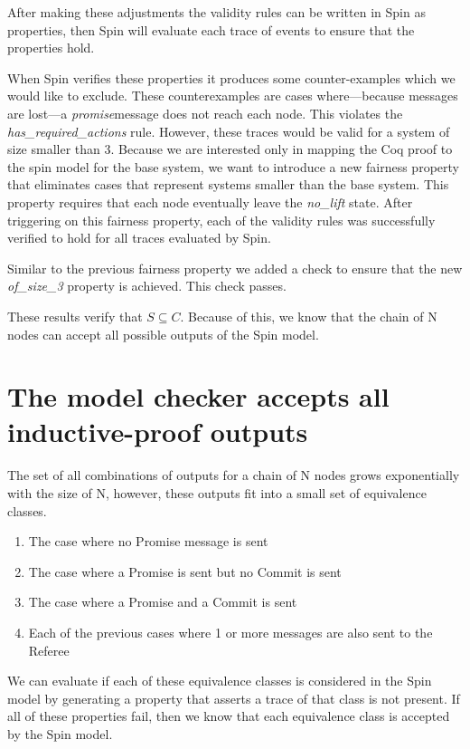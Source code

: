 \documentclass[runningheads]{llncs}
\newcommand{\promise}{\emph{promise}}
\newif\ifcomments
\newcommand{\krs}[1]{\ifcomments\textcolor{blue}{krs: #1}\fi}
\begin{document}
After making these adjustments the validity rules can be written in Spin as properties, then Spin will evaluate each trace of events to ensure that the properties hold. 

When Spin verifies these properties it produces some counter-examples which we would like to exclude. These counterexamples are cases where---because messages are lost---a \promise message does not reach each node. This violates the \emph{has\_required\_actions} rule. However, these traces would be valid for a system of size smaller than 3. Because we are interested only in mapping the Coq proof to the spin model for the base system, we want to introduce a new fairness property that eliminates cases that represent systems smaller than the base system. This property requires that each node eventually leave the \emph{no\_lift} state. After triggering on this fairness property, each of the validity rules was successfully verified to hold for all traces evaluated by Spin. 

Similar to the previous fairness property we added a check to ensure that the new \emph{of\_size\_3} property is achieved. This check passes.

These results verify that $S \subseteq C$. Because of this, we know that the chain of N nodes can accept all possible outputs of the Spin model. 

\section{The model checker accepts all inductive-proof outputs}
\label{sec:outputs_bigger}
The set of all combinations of outputs for a chain of N nodes grows exponentially with the size of N, however, these outputs fit into a small set of equivalence classes. 

\begin{enumerate}
    \item The case where no Promise message is sent
    \item The case where a Promise is sent but no Commit is sent
    \item The case where a Promise and a Commit is sent
    \item Each of the previous cases where 1 or more messages are also sent to the Referee
\end{enumerate}

We can evaluate if each of these equivalence classes is considered in the Spin model by generating a property that asserts a trace of that class is not present. If all of these properties fail, then we know that each equivalence class is accepted by the Spin model.
\krs{Add this to the mapping spin model. And add results here}
\end{document}
